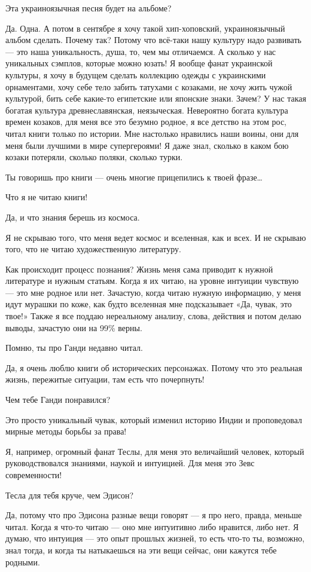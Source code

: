Эта украиноязычная песня будет на альбоме?

Да. Одна. А потом в сентябре я хочу такой хип-хоповский, украиноязычный альбом
сделать. Почему так? Потому что всё-таки нашу культуру надо развивать --- это
наша уникальность, душа,  то, чем мы отличаемся. А сколько у нас уникальных
сэмплов, которые можно юзать! Я вообще фанат украинской культуры, я хочу в
будущем сделать коллекцию одежды с украинскими орнаментами, хочу себе тело
забить татухами с козаками, не хочу жить чужой культурой, бить себе какие-то
египетские или японские знаки. Зачем? У нас такая богатая культура
древнеславянская, неязыческая. Невероятно богата культура времен козаков, для
меня все это безумно родное, я все детство на этом рос, читал книги только по
истории. Мне настолько нравились наши воины, они для меня были лучшими в мире
супергероями! Я даже знал, сколько в каком бою козаки потеряли, сколько поляки,
сколько турки.

Ты говоришь про книги --- очень многие прицепились к твоей фразе…

Что я не читаю книги!

Да, и что знания берешь из космоса.

Я не скрываю того, что меня ведет космос и вселенная, как и всех. И не скрываю
того, что не читаю художественную литературу.

Как происходит процесс познания? Жизнь меня сама приводит к нужной литературе и
нужным статьям. Когда я их читаю, на уровне интуиции чувствую --- это мне родное
или нет. Зачастую, когда читаю нужную информацию, у меня идут мурашки по коже,
как будто вселенная мне подсказывает «Да, чувак, это твое!» Также я все поддаю
нереальному анализу, слова, действия и потом делаю выводы, зачастую они на 99\%
верны.

Помню, ты про Ганди недавно читал.

Да, я очень люблю книги об исторических персонажах. Потому что это реальная
жизнь, пережитые ситуации, там есть что почерпнуть!

Чем тебе Ганди понравился?

Это просто уникальный чувак, который изменил историю Индии и проповедовал
мирные методы борьбы за права!

Я, например, огромный фанат Теслы, для меня это величайший человек, который
руководствовался знаниями, наукой и интуицией. Для меня это Зевс современности!

Тесла для тебя круче, чем Эдисон?

Да, потому что про Эдисона разные вещи говорят --- я про него, правда, меньше
читал. Когда я что-то читаю --- оно мне интуитивно либо нравится, либо нет. Я
думаю, что интуиция --- это опыт прошлых жизней, то есть что-то ты, возможно,
знал тогда, и когда ты натыкаешься на эти вещи сейчас, они кажутся тебе
родными.

